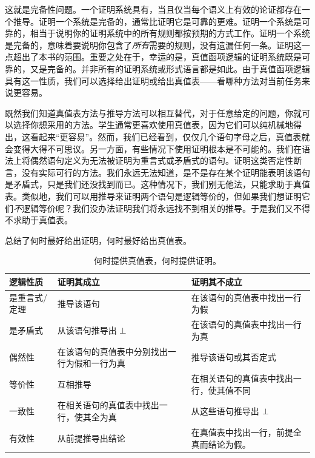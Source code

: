 这就是完备性问题。一个证明系统具有\label{def:completeness}，当且仅当每个语义上有效的论证都存在一个推导。证明一个系统是完备的，通常比证明它是可靠的更难。证明一个系统是可靠的，相当于说明你的证明系统中的所有规则都按预期的方式工作。证明一个系统是完备的，意味着要说明你包含了\emph{所有}需要的规则，没有遗漏任何一条。证明这一点超出了本书的范围。重要之处在于，幸运的是，真值函项逻辑的证明系统既是可靠的，又是完备的。并非所有的证明系统或形式语言都是如此。由于真值函项逻辑具有这一性质，我们可以选择给出证明或给出真值表——看哪种方法对当前任务来说更容易。

既然我们知道真值表方法与推导方法可以相互替代，对于任意给定的问题，你就可以选择你想采用的方法。学生通常更喜欢使用真值表，因为它们可以纯机械地得出，这看起来“更容易”。然而，我们已经看到，仅仅几个语句字母之后，真值表就会变得大得不可思议。另一方面，有些情况下使用证明根本是不可能的。我们在语法上将偶然语句定义为无法被证明为重言式或矛盾式的语句。证明这类否定性断言，没有实际可行的方法。我们永远无法知道，是不是存在某个证明能表明该语句是矛盾式，只是我们还没找到而已。这种情况下，我们别无他法，只能求助于真值表。类似地，我们可以用推导来证明两个语句是逻辑等价的，但如果我们想证明它们\emph{不}逻辑等价呢？我们没办法证明我们将永远找不到相关的推导。于是我们又不得不求助于真值表。

总结了何时最好给出证明，何时最好给出真值表。

\def\tmptable{\textbf{逻辑性质} 	&	\textbf{证明其成立} 	&	\textbf{证明其不成立} \\ \hline \hline
是重言式/定理 		& 推导该语句  						& 在该语句的真值表中找出一行为假 \\ \hline
是矛盾式 	&  从该语句推导出 $\ered$  		 & 在该语句的真值表中找出一行为真 \\ \hline
偶然性 			& 在该语句的真值表中分别找出一行为假和一行为真 & 推导该语句或其否定式 \\ \hline
等价性 			& 互相推导 		 & 在相关语句的真值表中找出一行，使其值不同 \\ \hline
一致性 		& 在相关语句的真值表中找出一行，使其全为真 & 从这些语句推导出 $\ered$\\ \hline
有效性 				& 从前提推导出结论 & 在真值表中找出一行，前提全真而结论为假。 \\ }

\ifHTMLtarget


\begin{table}
\begin{tabularx}{\textwidth}{X||X|X}
\tmptable
\end{tabularx}
\caption{何时提供真值表，何时提供证明。}
\label{table.ProofOrModel}
\end{table}


